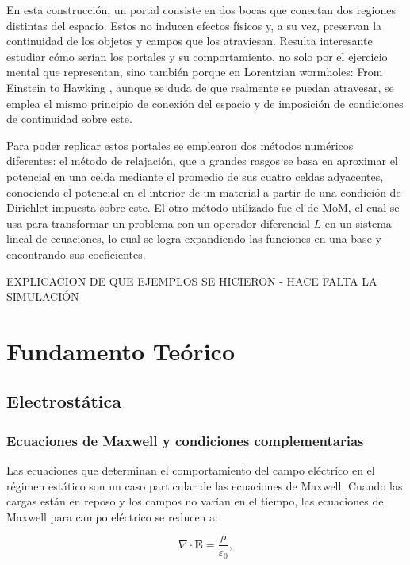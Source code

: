 \documentclass[12pt, twocolumn]{article}
\begin{document}
En esta construcción, un portal consiste en dos bocas que conectan dos regiones distintas del espacio. Estos no inducen efectos físicos y, a su vez, preservan la continuidad de los objetos y campos que los atraviesan. Resulta interesante estudiar cómo serían los portales y su comportamiento, no solo por el ejercicio mental que representan, sino también porque en Lorentzian wormholes: From Einstein to Hawking \cite{wormholes}, aunque se duda de que realmente se puedan atravesar, se emplea el mismo principio de conexión del espacio y de imposición de condiciones de continuidad sobre este.

Para poder replicar estos portales se emplearon dos métodos numéricos diferentes: el método de relajación, que a grandes rasgos se basa en aproximar el potencial en una celda mediante el promedio de sus cuatro celdas adyacentes, conociendo el potencial en el interior de un material a partir de una condición de Dirichlet impuesta sobre este. El otro método utilizado fue el de MoM, el cual se usa para transformar un problema con un operador diferencial $L$ en un sistema lineal de ecuaciones, lo cual se logra expandiendo las funciones en una base y encontrando sus coeficientes.

EXPLICACION DE QUE EJEMPLOS SE HICIERON - HACE FALTA LA SIMULACIÓN

\vspace{-10pt}

\section{Fundamento Teórico}

\subsection{Electrostática}

\subsubsection{Ecuaciones de Maxwell y condiciones complementarias}

Las ecuaciones que determinan el comportamiento del campo eléctrico en el régimen estático son un caso particular de las ecuaciones de Maxwell. Cuando las cargas están en reposo y los campos no varían en el tiempo, las ecuaciones de Maxwell para campo eléctrico se reducen a:

\begin{equation}
    \nabla \cdot \mathbf{E} = \frac{\rho}{\varepsilon_0}, \label{eq:gauss_dif}
\end{equation}
\end{document}
